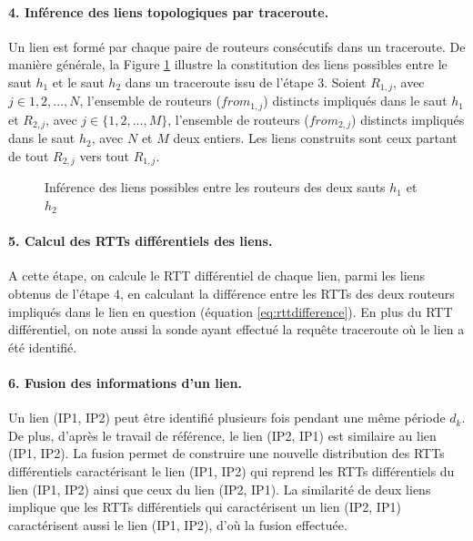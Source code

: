 \paragraph{4. Inférence des liens topologiques par traceroute.} Un lien  est formé par chaque paire de routeurs consécutifs dans un traceroute. De manière générale, la Figure \ref{fig:link-inference_} illustre la constitution des liens possibles entre le saut $h_1$ et le saut $h_2$  dans un traceroute issu de l'étape $3$. Soient  $R_{1,j}$, avec $j \in {1,2, ...,N}$,  l'ensemble de routeurs ($from_{1,j}$) distincts impliqués dans le saut $h_1$ et $R_{2,j}$, avec $j \in \{1,2, ..., M\}$, l'ensemble  de routeurs ($from_{2,j}$) distincts impliqués dans le saut $h_2$, avec $ N $ et $ M $ deux entiers. Les liens  construits sont ceux partant de tout $R_{2,j}$ vers tout $R_{1,j}$. 
\begin{figure}[h]
	\centering
	\captionsetup{justification=centering}
	\resizebox{0.4\textwidth}{!}{
		
	}
	\caption{Inférence des liens possibles entre les routeurs des deux sauts $h_{1}$ et $h_{2}$}
	\label{fig:link-inference_}
\end{figure}
\paragraph{5. Calcul des RTTs différentiels des liens.}  A cette étape, on calcule le RTT différentiel de chaque  lien, parmi les liens obtenus de l'étape $4$, en calculant la différence entre les RTTs des deux routeurs impliqués dans le  lien en question (équation \ref{eq:rttdifference}). En plus du RTT différentiel, on note aussi la sonde  ayant effectué la requête traceroute où le lien a été identifié. 


\paragraph{6. Fusion des informations d'un lien.} Un lien (IP1, IP2) peut être identifié plusieurs fois pendant une même période $d_k$. De plus, d'après le travail de référence,  le lien (IP2, IP1) est similaire au lien  (IP1, IP2). La fusion permet de construire une nouvelle distribution des RTTs différentiels caractérisant le lien (IP1, IP2) qui reprend les RTTs différentiels du lien (IP1, IP2) ainsi que ceux du lien (IP2, IP1). La similarité de deux liens  implique que les RTTs différentiels qui caractérisent un lien (IP2, IP1) caractérisent aussi le lien (IP1, IP2), d'où la fusion effectuée.


